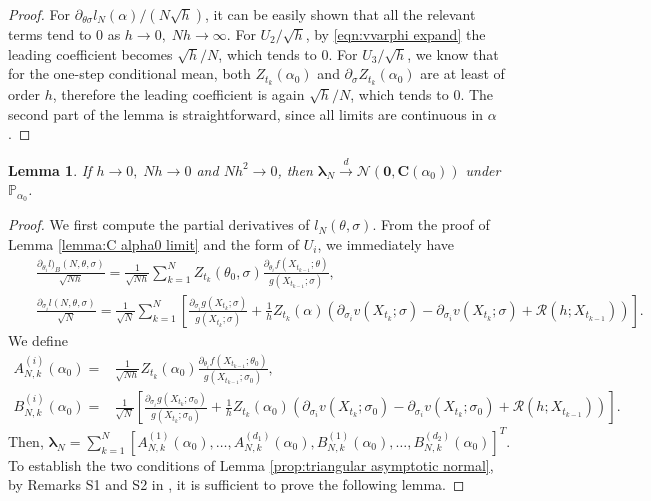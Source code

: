 \documentclass[a4paper,12pt]{article}
\numberwithin{equation}{section}
\theoremstyle{plain}
\newtheorem{lemma}[theorem]{Lemma}
\theoremstyle{definition}
\begin{document}
\begin{appendix}
\begin{proof}
    For $\partial_{\theta\sigma}l_N(\alpha)/(N\sqrt{h})$, it can be easily shown that all the relevant terms tend to $0$ as $h\to 0,\; Nh\to \infty$. For $U_2/\sqrt{h}$, by \eqref{eqn:vvarphi expand} the leading coefficient becomes $\sqrt{h}/N$, which tends to $0$. For $U_3/\sqrt{h}$, we know that for the one-step conditional mean, both $Z_{t_k}(\alpha_0)$ and $\partial_{\sigma}Z_{t_k}(\alpha_0)$ are at least of order $h$, therefore the leading coefficient is again $\sqrt{h}/N$, which tends to $0$. The second part of the lemma is straightforward, since all  limits are continuous in $\alpha$.
\end{proof}
\begin{lemma}\label{lemma:lambda limit}
    If $h\to0,\;Nh\to0$ and $Nh^2\to 0$, then $\boldsymbol{\lambda}_N \xrightarrow{d} \mathcal{N}(\mathbf{0},\mathbf{C}(\alpha_0))$ under $\mathbb{P}_{\alpha_0}$.
\end{lemma}


\begin{proof}
We first compute the partial derivatives of $l_N(\theta,\sigma)$. From the proof of Lemma \ref{lemma:C alpha0 limit} and the form of $U_i$, we immediately have
    \begin{eqnarray*}
&&\frac{\partial_{\theta_i}l)_B(N,\theta,\sigma)}{\sqrt{Nh}}=\frac{1}{\sqrt{Nh}}\sum_{k=1}^N Z_{t_k}(\theta_0,\sigma)\frac{\partial_{\theta_i}f(X_{t_{k-1}};\theta)}{g(X_{t_{k-1}};\sigma)}, \\&&       \frac{\partial_{\sigma_i}l(N,\theta,\sigma)}{\sqrt{N}}=\frac{1}{\sqrt{N}}\sum_{k=1}^N\left[\frac{\partial_{\sigma_i}g(X_{t_{k}};\sigma)}{g(X_{t_k};\sigma)}+\frac{1}{h}Z_{t_k}(\alpha)\left(\partial_{\sigma_i}v(X_{t_k};\sigma)-\partial_{\sigma_i}v(X_{t_k};\sigma)+\mathcal{R}(h;X_{t_{k-1}}) \right)\right].
    \end{eqnarray*}
    We define
    \begin{align}
        A^{(i)}_{N,k}(\alpha_0)=&\frac{1}{\sqrt{Nh}}Z_{t_k}(\alpha_0)\frac{\partial_{\theta_i}f(X_{t_{k-1}};\theta_0)}{g(X_{t_{k-1}};\sigma_0)},\label{eqn:A_ink}\\
        B^{(i)}_{N,k}(\alpha_0)=&\frac{1}{\sqrt{N}}\left[\frac{\partial_{\sigma_i}g(X_{t_{k}};\sigma_0)}{g(X_{t_k};\sigma_0)}+\frac{1}{h}Z_{t_k}(\alpha_0)\left(\partial_{\sigma_i}v(X_{t_k};\sigma_0)-\partial_{\sigma_i}v(X_{t_k};\sigma_0)+\mathcal{R}(h;X_{t_{k-1}}) \right)\right].\label{eqn:B_ink}
    \end{align}
    Then,  $\mathbf{\lambda}_N=\sum_{k=1}^N\left[A^{(1)}_{N,k}(\alpha_0),\dots,A^{(d_1)}_{N,k}(\alpha_0),B^{(1)}_{N,k}(\alpha_0),\dots,B^{(d_2)}_{N,k}(\alpha_0)\right]^T$. To establish the two conditions of Lemma \ref{prop:triangular asymptotic normal}, by Remarks S1 and S2 in \cite{pilipovic_parameter_2024}, it is sufficient to prove the following lemma.
\end{proof}


\end{appendix}
\end{document}
